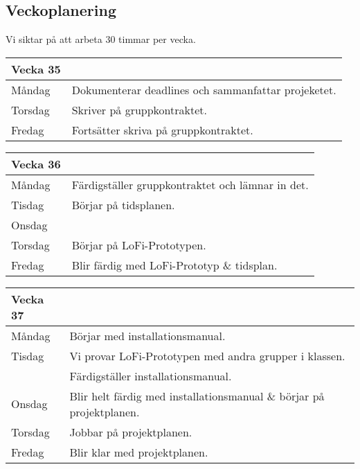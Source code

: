 \documentclass{liu_mall}
\begin{document}
\subsection{Veckoplanering}
Vi siktar på att arbeta 30 timmar per vecka.
\begin{table}[!h]
    \begin{tabularx}{\textwidth}{l|l}
        Vecka 35\\\hline
        Måndag  & Dokumenterar deadlines och sammanfattar projeketet.\\
        Torsdag & Skriver på gruppkontraktet.\\
        Fredag  & Fortsätter skriva på gruppkontraktet.\\
    \end{tabularx}
\end{table}

\begin{table}[!h]
    \begin{tabularx}{\textwidth}{l|l}
        Vecka 36\\\hline
        Måndag  & Färdigställer gruppkontraktet och lämnar in det.\\ %
        Tisdag  & Börjar på tidsplanen.\\
        Onsdag  & \\ %
        Torsdag & Börjar på LoFi-Prototypen.\\ %
        Fredag  & Blir färdig med LoFi-Prototyp \& tidsplan.\\
    \end{tabularx}
\end{table}

\begin{table}[!h]
    \begin{tabularx}{\textwidth}{l|l}
        Vecka 37\\\hline
        Måndag  & Börjar med installationsmanual.\\ %
        Tisdag  & Vi provar LoFi-Prototypen med andra grupper i klassen.\\
                & Färdigställer installationsmanual.\\
        Onsdag  & Blir helt färdig med installationsmanual \& börjar på projektplanen.\\ %
        Torsdag & Jobbar på projektplanen.\\ %
        Fredag  & Blir klar med projektplanen.\\ %
    \end{tabularx}
\end{table}
\end{document}
